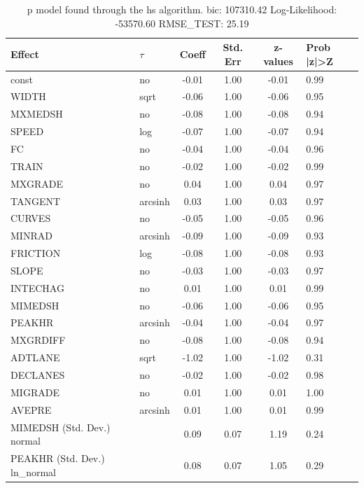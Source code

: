 \begin{table}
	\caption{p model found through the hs algorithm. bic: 107310.42 Log-Likelihood: -53570.60 RMSE_TEST: 25.19}
	\begin{center}
		\begin{tabular}{|l|l|c|c|c|l|}
			\hline
			Effect & $\tau$ & Coeff & Std. Err & z-values & Prob |z|>Z \\
			\hline
			const & no & -0.01 & 1.00 & -0.01 & 0.99 \\
			\hline
			WIDTH & sqrt & -0.06 & 1.00 & -0.06 & 0.95 \\
			\hline
			MXMEDSH & no & -0.08 & 1.00 & -0.08 & 0.94 \\
			\hline
			SPEED & log & -0.07 & 1.00 & -0.07 & 0.94 \\
			\hline
			FC & no & -0.04 & 1.00 & -0.04 & 0.96 \\
			\hline
			TRAIN & no & -0.02 & 1.00 & -0.02 & 0.99 \\
			\hline
			MXGRADE & no & 0.04 & 1.00 & 0.04 & 0.97 \\
			\hline
			TANGENT & arcsinh & 0.03 & 1.00 & 0.03 & 0.97 \\
			\hline
			CURVES & no & -0.05 & 1.00 & -0.05 & 0.96 \\
			\hline
			MINRAD & arcsinh & -0.09 & 1.00 & -0.09 & 0.93 \\
			\hline
			FRICTION & log & -0.08 & 1.00 & -0.08 & 0.93 \\
			\hline
			SLOPE & no & -0.03 & 1.00 & -0.03 & 0.97 \\
			\hline
			INTECHAG & no & 0.01 & 1.00 & 0.01 & 0.99 \\
			\hline
			MIMEDSH & no & -0.06 & 1.00 & -0.06 & 0.95 \\
			\hline
			PEAKHR & arcsinh & -0.04 & 1.00 & -0.04 & 0.97 \\
			\hline
			MXGRDIFF & no & -0.08 & 1.00 & -0.08 & 0.94 \\
			\hline
			ADTLANE & sqrt & -1.02 & 1.00 & -1.02 & 0.31 \\
			\hline
			DECLANES & no & -0.02 & 1.00 & -0.02 & 0.98 \\
			\hline
			MIGRADE & no & 0.01 & 1.00 & 0.01 & 1.00 \\
			\hline
			AVEPRE & arcsinh & 0.01 & 1.00 & 0.01 & 0.99 \\
			\hline
			MIMEDSH (Std. Dev.) normal &  & 0.09 & 0.07 & 1.19 & 0.24 \\
			\hline
			PEAKHR (Std. Dev.) ln_normal &  & 0.08 & 0.07 & 1.05 & 0.29 \\

\end{tabular}
\end{center}
\end{table}
